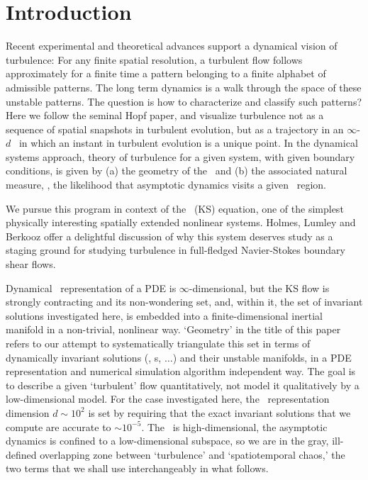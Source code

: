 
\section{Introduction}

Recent experimental and theoretical advances
support a dynamical vision of turbulence:
For any finite  spatial resolution,
a turbulent flow follows approximately for a finite time
a pattern belonging to a
{ finite alphabet}
of admissible patterns.
The long term dynamics is
a {walk through the space of these unstable patterns}.
The question is how to characterize and classify such patterns?
Here we follow the seminal Hopf paper, and  visualize
turbulence not as  a sequence of
spatial snapshots in turbulent evolution,
but as a trajectory in an
 $\infty$-$d$ \statesp\ in which an
instant in turbulent evolution is
a {unique} point. In the dynamical systems approach,
theory of turbulence for a given system, with given boundary conditions,
is given by
(a) the geometry of the \statesp\ and (b) the associated natural measure,
\ie,
the likelihood that asymptotic dynamics visits a given \statesp\ region.

We pursue this program in context of the \KS\ (KS) equation,
one of the simplest physically interesting spatially extended
nonlinear systems.  Holmes, Lumley and Berkooz offer a
delightful discussion of why this system deserves study as a staging
ground for studying turbulence in full-fledged Navier-Stokes
boundary shear flows.

Dynamical \statesp\ representation of a PDE is
$\infty$-dimensional, but the KS flow is strongly contracting
and its non-wondering set, and, within it, the set of
invariant solutions investigated here, is embedded into a
finite-dimensional inertial manifold in a
non-trivial, nonlinear way. `Geometry' in the title of this
paper refers to our attempt to systematically triangulate
this set in terms of dynamically invariant solutions (\eqva,
\po s, $\ldots$) and their unstable manifolds, in a PDE
representation and numerical simulation algorithm independent
way. The goal is to describe a given `turbulent' flow
quantitatively, not model it qualitatively by a
low-dimensional model. For the case investigated here, the
\statesp\ representation dimension $d \sim 10^2$ is set by
requiring that the exact invariant solutions that we compute
are accurate to $\sim 10^{-5}$. The \statesp\ is
high-dimensional, the asymptotic dynamics is confined to a
low-dimensional subspace, so we are in the gray, ill-defined
overlapping zone between `turbulence' and `spatiotemporal
chaos,' the two terms that we shall use interchangeably in
what follows.

